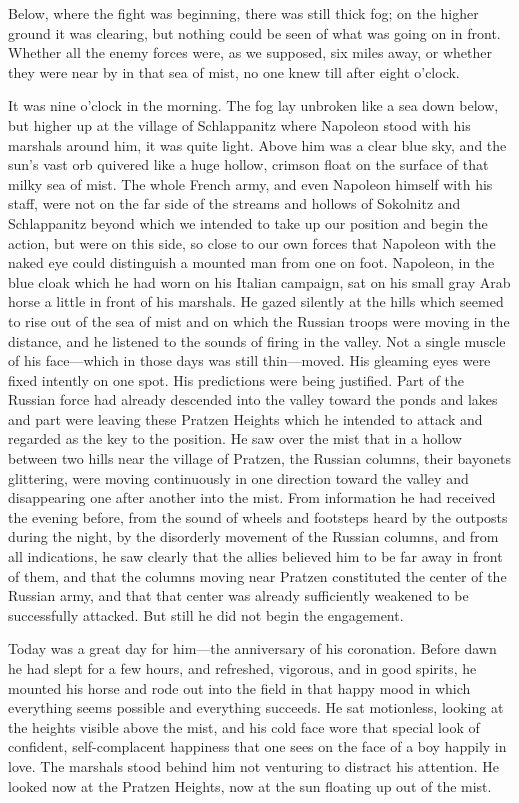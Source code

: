 Below, where the fight was beginning, there was still thick fog;
on the higher ground it was clearing, but nothing could be seen
of what was going on in front. Whether all the enemy forces were,
as we supposed, six miles away, or whether they were near by in
that sea of mist, no one knew till after eight o'clock.

It was nine o'clock in the morning. The fog lay unbroken like a
sea down below, but higher up at the village of Schlappanitz
where Napoleon stood with his marshals around him, it was quite
light. Above him was a clear blue sky, and the sun's vast orb
quivered like a huge hollow, crimson float on the surface of that
milky sea of mist. The whole French army, and even Napoleon
himself with his staff, were not on the far side of the streams
and hollows of Sokolnitz and Schlappanitz beyond which we
intended to take up our position and begin the action, but were
on this side, so close to our own forces that Napoleon with the
naked eye could distinguish a mounted man from one on
foot. Napoleon, in the blue cloak which he had worn on his
Italian campaign, sat on his small gray Arab horse a little in
front of his marshals. He gazed silently at the hills which
seemed to rise out of the sea of mist and on which the Russian
troops were moving in the distance, and he listened to the sounds
of firing in the valley. Not a single muscle of his face---which
in those days was still thin---moved. His gleaming eyes were
fixed intently on one spot. His predictions were being
justified. Part of the Russian force had already descended into
the valley toward the ponds and lakes and part were leaving these
Pratzen Heights which he intended to attack and regarded as the
key to the position. He saw over the mist that in a hollow
between two hills near the village of Pratzen, the Russian
columns, their bayonets glittering, were moving continuously in
one direction toward the valley and disappearing one after
another into the mist. From information he had received the
evening before, from the sound of wheels and footsteps heard by
the outposts during the night, by the disorderly movement of the
Russian columns, and from all indications, he saw clearly that
the allies believed him to be far away in front of them, and that
the columns moving near Pratzen constituted the center of the
Russian army, and that that center was already sufficiently
weakened to be successfully attacked. But still he did not begin
the engagement.

Today was a great day for him---the anniversary of his
coronation. Before dawn he had slept for a few hours, and
refreshed, vigorous, and in good spirits, he mounted his horse
and rode out into the field in that happy mood in which
everything seems possible and everything succeeds. He sat
motionless, looking at the heights visible above the mist, and
his cold face wore that special look of confident,
self-complacent happiness that one sees on the face of a boy
happily in love. The marshals stood behind him not venturing to
distract his attention. He looked now at the Pratzen Heights, now
at the sun floating up out of the mist.

